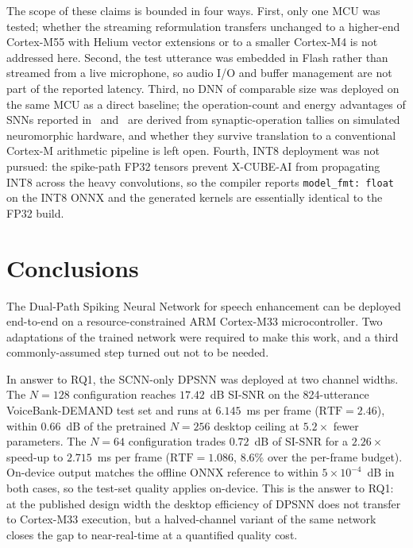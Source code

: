 \documentclass[conference]{IEEEtran}
\begin{document}
The scope of these claims is bounded in four ways. First, only one MCU was tested; whether the streaming reformulation transfers unchanged to a higher-end Cortex-M55 with Helium vector extensions or to a smaller Cortex-M4 is not addressed here. Second, the test utterance was embedded in Flash rather than streamed from a live microphone, so audio I/O and buffer management are not part of the reported latency. Third, no DNN of comparable size was deployed on the same MCU as a direct baseline; the operation-count and energy advantages of SNNs reported in~\cite{b1} and~\cite{b4} are derived from synaptic-operation tallies on simulated neuromorphic hardware, and whether they survive translation to a conventional Cortex-M arithmetic pipeline is left open. Fourth, INT8 deployment was not pursued: the spike-path FP32 tensors prevent X-CUBE-AI from propagating INT8 across the heavy convolutions, so the compiler reports \texttt{model\_fmt: float} on the INT8 ONNX and the generated kernels are essentially identical to the FP32 build.


\section{Conclusions}

The Dual-Path Spiking Neural Network for speech enhancement can be deployed end-to-end on a resource-constrained ARM Cortex-M33 microcontroller. Two adaptations of the trained network were required to make this work, and a third commonly-assumed step turned out not to be needed.

In answer to RQ1, the SCNN-only DPSNN was deployed at two channel widths. The $N{=}128$ configuration reaches $17.42$~dB SI-SNR on the 824-utterance VoiceBank-DEMAND test set and runs at $6.145$~ms per frame ($\mathrm{RTF}=2.46$), within $0.66$~dB of the pretrained $N{=}256$ desktop ceiling at $5.2\times$ fewer parameters. The $N{=}64$ configuration trades $0.72$~dB of SI-SNR for a $2.26\times$ speed-up to $2.715$~ms per frame ($\mathrm{RTF}=1.086$, $8.6\%$ over the per-frame budget). On-device output matches the offline ONNX reference to within $5 \times 10^{-4}$~dB in both cases, so the test-set quality applies on-device. This is the answer to RQ1: at the published design width the desktop efficiency of DPSNN does not transfer to Cortex-M33 execution, but a halved-channel variant of the same network closes the gap to near-real-time at a quantified quality cost.
\end{document}
